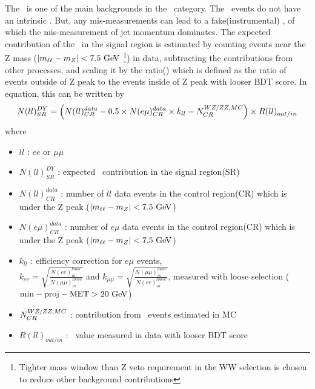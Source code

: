 The \dyll\ is one of the main backgrounds in the \SF\ category.   
The \dyll\ events do not have an intrinsic \met. But, any mis-measurements can 
lead to a fake(instrumental) \met, of which the mis-measurement of jet momentum dominates.  
The expected contribution of the \dyll\ in the signal region is estimated by 
counting events near the Z mass ($|m_{\ell\ell} - m_Z| < 7.5~\mathrm{Ge\kern -0.1em V}$
\footnote{Tighter mass window than Z veto requirement in the WW selection is chosen
to reduce other background contributions}) in data, subtracting 
the contributions from other processes, and scaling it by the ratio(\routin) 
which is defined as the ratio of events outside of Z peak to the events inside
of Z peak with looser BDT score. In equation, this can be written by 
\begin{eqnarray} 
N(ll)^{DY}_{SR} 
= 
\left( N(ll)_{CR}^{data} - 0.5 \times N(e\mu)_{CR}^{data} \times k_{ll} - N_{CR}^{WZ/ZZ, MC} \right) 
\times R(ll)_{out/in}
\end{eqnarray} 
where 
\begin{itemize}
\item $ll$ : $ee$ or $\mu\mu$ 
\item $N(ll)^{DY}_{SR}$ : expected \dyll\ contribution in the signal region(SR) 
\item $N(ll)_{CR}^{data}$ : number of $ll$ data events in the control region(CR) which is 
      under the Z peak ($|m_{\ell\ell} - m_Z| < 7.5~\mathrm{Ge\kern -0.1em V}$)  
\item $N(e\mu)_{CR}^{data}$ : number of $e\mu$ data events in the control region(CR) which is 
      under the Z peak ($|m_{\ell\ell} - m_Z| < 7.5~\mathrm{Ge\kern -0.1em V}$)  
\item $k_{ll}$ : efficiency correction for $e\mu$ events,  \\
      $\displaystyle k_{ee} = \sqrt{\frac{N(ee)_{in}^{loose}}{N(\mu\mu)_{in}^{loose}}}$  and   
      $\displaystyle k_{\mu\mu} = \sqrt{\frac{N(\mu\mu)_{in}^{loose}}{N(ee)_{in}^{loose}}}$,
      measured with loose selection ($\mathrm{min-proj-MET} > 20~\mathrm{Ge\kern -0.1em V}$) 
\item $N_{CR}^{WZ/ZZ, MC}$ : contribution from \vv\ events estimated in MC
\item $R(ll)_{out/in}$ : \routin\ value measured in data with looser BDT score
\end{itemize}

